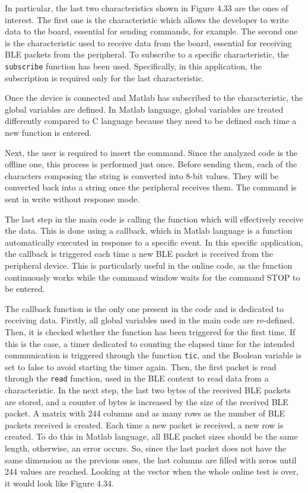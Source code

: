 \documentclass{Configuration_Files/PoliMi3i_thesis}
\begin{document}
In particular, the last two characteristics shown in Figure 4.33 are the ones of interest. The first one is the characteristic which allows the developer to write data to the board, essential for sending commands, for example. The second one is the characteristic used to receive data from the board, essential for receiving BLE packets from the peripheral. To subscribe to a specific characteristic, the \texttt{subscribe} function has been used. Specifically, in this application, the subscription is required only for the last characteristic.

Once the device is connected and Matlab has subscribed to the characteristic, the global variables are defined. In Matlab language, global variables are treated differently compared to C language because they need to be defined each time a new function is entered.

Next, the user is required to insert the command. Since the analyzed code is the offline one, this process is performed just once. Before sending them, each of the characters composing the string is converted into 8-bit values. They will be converted back into a string once the peripheral receives them. The command is sent in write without response mode.

The last step in the main code is calling the function which will effectively receive the data. This is done using a callback, which in Matlab language is a function automatically executed in response to a specific event. In this specific application, the callback is triggered each time a new BLE packet is received from the peripheral device. This is particularly useful in the online code, as the function continuously works while the command window waits for the command STOP to be entered.

The callback function is the only one present in the code and is dedicated to receiving data. Firstly, all global variables used in the main code are re-defined. Then, it is checked whether the function has been triggered for the first time. If this is the case, a timer dedicated to counting the elapsed time for the intended communication is triggered through the function \texttt{tic}, and the Boolean variable is set to false to avoid starting the timer again. Then, the first packet is read through the \texttt{read} function, used in the BLE context to read data from a characteristic. In the next step, the last two bytes of the received BLE packets are stored, and a counter of bytes is increased by the size of the received BLE packet. A matrix with 244 columns and as many rows as the number of BLE packets received is created. Each time a new packet is received, a new row is created. To do this in Matlab language, all BLE packet sizes should be the same length, otherwise, an error occurs. So, since the last packet does not have the same dimension as the previous ones, the last columns are filled with zeros until 244 values are reached. Looking at the vector when the whole online test is over, it would look like Figure 4.34.
\end{document}
